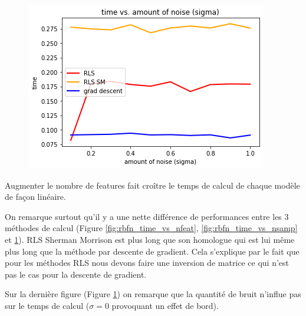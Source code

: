 \documentclass[french,12pt]{article}
\begin{document}
\begin{figure}[ht]
\begin{minipage}{.33\textwidth}
	\label{fig:rbfn_time_vs_nsamp}
\end{minipage}\hfill
\begin{minipage}{.33\textwidth}
	\centering
	\includegraphics[width=\textwidth]{time_vs_noise.png}
	\label{fig:rbfn_time_vs_noise}
\end{minipage}
\end{figure}

Augmenter le nombre de features fait croître le temps de calcul de chaque modèle de façon linéaire.

On remarque surtout qu'il y a une nette différence de performances entre les 3 méthodes de calcul (Figure \ref{fig:rbfn_time_vs_nfeat}, \ref{fig:rbfn_time_vs_nsamp} et \ref{fig:rbfn_time_vs_noise}). RLS Sherman Morrison est plus long que son homologue qui est lui même plus long que la méthode par descente de gradient. Cela s’explique par le fait que pour les méthodes RLS nous devons faire une inversion de matrice ce qui n’est pas le cas pour la descente de gradient.

Sur la dernière figure (Figure \ref{fig:rbfn_time_vs_noise}) on remarque que la quantité de bruit n'influe pas sur le temps de calcul ($\sigma=0$ provoquant un effet de bord).
\end{document}
